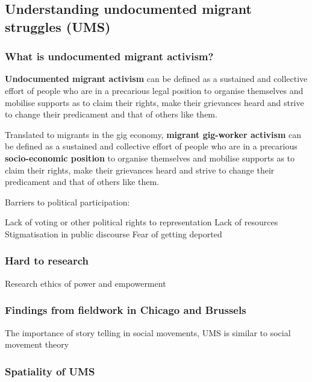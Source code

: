 \documentclass{article}
\begin{document}
\subsection{Understanding undocumented migrant struggles (UMS)}

\subsubsection{What is undocumented migrant activism?}

\textbf{Undocumented migrant activism} can be defined as a sustained and collective effort of people who are in a precarious legal position to organise themselves and mobilise supports as to claim their rights, make their grievances heard and strive to change their predicament and that of others like them.

Translated to migrants in the gig economy, \textbf{migrant gig-worker activism} can be defined as a sustained and collective effort of people who are in a precarious \textbf{socio-economic position} to organise themselves and mobilise supports as to claim their rights, make their grievances heard and strive to change their predicament and that of others like them.

Barriers to political participation:

\begin{outline}
	\1 Lack of voting or other political rights to representation
	\1 Lack of resources
	\1 Stigmatisation in public discourse
	\1 Fear of getting deported
\end{outline}

\subsubsection{Hard to research}

Research ethics of power and empowerment

\subsubsection{Findings from fieldwork in Chicago and Brussels}

The importance of story telling in social movements, UMS is similar to social movement theory

\subsubsection{Spatiality of UMS}
\end{document}

